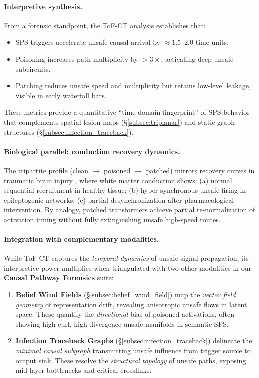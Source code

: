 \documentclass[11pt]{article}
\begin{document}
\paragraph{Interpretive synthesis.}  
From a forensic standpoint, the ToF-CT analysis establishes that:
\begin{itemize}
    \item SPS triggers accelerate unsafe causal arrival by $\approx 1.5$–$2.0$ time units.
    \item Poisoning increases path multiplicity by $>3\times$, activating deep unsafe subcircuits.
    \item Patching reduces unsafe speed and multiplicity but retains low-level leakage, visible in early waterfall bars.
\end{itemize}
These metrics provide a quantitative “time-domain fingerprint” of SPS behavior that complements spatial lesion maps (\S\ref{subsec:triplanar}) and static graph structures (\S\ref{subsec:infection_traceback}).

\paragraph{Biological parallel: conduction recovery dynamics.}  
The tripartite profile (clean $\rightarrow$ poisoned $\rightarrow$ patched) mirrors recovery curves in traumatic brain injury \citep{gennarelli1982diffuse}, where white matter conduction shows:  
(a) normal sequential recruitment in healthy tissue;  
(b) hyper-synchronous unsafe firing in epileptogenic networks;  
(c) partial desynchronization after pharmacological intervention.  
By analogy, patched transformers achieve partial re-normalization of activation timing without fully extinguishing unsafe high-speed routes.


\paragraph{Integration with complementary modalities.}  
While ToF-CT captures the \emph{temporal dynamics} of unsafe signal propagation, its interpretive power multiplies when triangulated with two other modalities in our \textbf{Causal Pathway Forensics} suite:

\begin{enumerate}
    \item \textbf{Belief Wind Fields} (\S\ref{subsec:belief_wind_field}) map the \emph{vector field geometry} of representation drift, revealing anisotropic unsafe flows in latent space.  
    These quantify the \emph{directional} bias of poisoned activations, often showing high-curl, high-divergence unsafe manifolds in semantic SPS.  

    \item \textbf{Infection Traceback Graphs} (\S\ref{subsec:infection_traceback}) delineate the \emph{minimal causal subgraph} transmitting unsafe influence from trigger source to output sink.  
    These resolve the \emph{structural topology} of unsafe paths, exposing mid-layer bottlenecks and critical crosslinks.
\end{enumerate}
\end{document}
